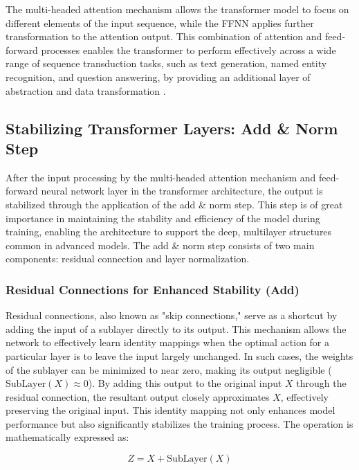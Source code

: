 The multi-headed attention mechanism allows the transformer model to focus on different elements of the input sequence, while the FFNN applies further transformation to the attention output. This combination of attention and feed-forward processes enables the transformer to perform effectively across a wide range of sequence transduction tasks, such as text generation, named entity recognition, and question answering, by providing an additional layer of abstraction and data transformation \cite{vaswani2017attention}.

\subsection{Stabilizing Transformer Layers: Add \& Norm Step}

After the input processing by the multi-headed attention mechanism and feed-forward neural network layer in the transformer architecture, the output is stabilized through the application of the add \& norm step. This step is of great importance in maintaining the stability and efficiency of the model during training, enabling the architecture to support the deep, multilayer structures common in advanced models. The add \& norm step consists of two main components: residual connection and layer normalization.

\subsubsection{Residual Connections for Enhanced Stability (Add)}

Residual connections, also known as "skip connections," serve as a shortcut by adding the input of a sublayer directly to its output. This mechanism allows the network to effectively learn identity mappings when the optimal action for a particular layer is to leave the input largely unchanged. In such cases, the weights of the sublayer can be minimized to near zero, making its output negligible (\(\text{SubLayer}(X) \approx 0\)). By adding this output to the original input \(X\) through the residual connection, the resultant output closely approximates \(X\), effectively preserving the original input. This identity mapping not only enhances model performance but also significantly stabilizes the training process. The operation is mathematically expressed as:

\begin{equation}
    Z = X + \text{SubLayer}(X)
\end{equation}

